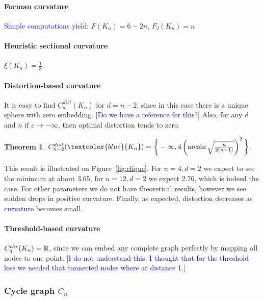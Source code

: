 \documentclass{article} %
\newtheorem{theorem}{Theorem}[section]
\newcommand{\ph}[1]{\textcolor{blue}{#1}}
\begin{document}
\paragraph{Forman curvature} 
\ph{Simple computations yield:}
$F(K_n) = 6 - 2n$, $F_2(K_n) = n$.

\paragraph{Heuristic sectional curvature} 
$\xi(K_n) = \frac{1}{8}$.

\paragraph{Distortion-based curvature}

It is easy to find $C_d^{dist}(K_n)$ for $d = n-2$, since in this case there is a unique sphere with zero embedding. \ph{[Do we have a reference for this?]} Also, for any $d$ and $n$ if $c \to -\infty$, then optimal distortion tends to zero.

\begin{theorem}\label{thm:clique_distortion}
$C_{n-2}^{dist}(\ph{K_n}) = \bigg\{-\infty,  4 \left(\arcsin \sqrt{\frac{n}{2(n-1)}}\right)^2\bigg\}$.
\end{theorem}

This result is illustrated on Figure~\ref{fig:clique}. For $n = 4, d = 2$ we expect to see the minimum at about $3.65$, for $n = 12, d = 2$ we expect $2.76$, which is indeed the case. For other parameters we do not have theoretical results, however we see sudden drops in positive curvature. Finally, as expected, distortion decreases as \ph{curvature} becomes small. 

\paragraph{Threshold-based curvature} 
$C_d^{thr}(K_n) = \mathbb{R}$, since we can embed any complete graph perfectly by mapping all nodes to one point. \ph{[I do not understand this. I thought that for the threshold loss we needed that connected nodes where at distance 1.]}


\subsubsection{Cycle graph $C_n$} 
\end{document}
